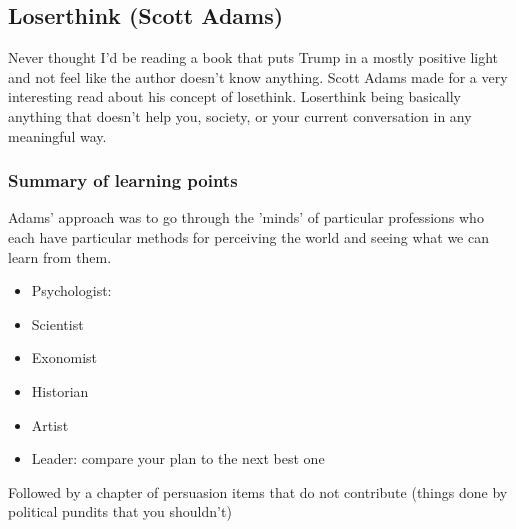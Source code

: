 \subsection{Loserthink (Scott Adams)}

Never thought I'd be reading a book that puts Trump in a mostly positive light and not feel like the author doesn't know anything.
Scott Adams made for a very interesting read about his concept of losethink. Loserthink being basically anything that doesn't help you, society, or your current conversation in any meaningful way.

\subsubsection{Summary of learning points}
Adams' approach was to go through the 'minds' of particular professions who each have particular methods for perceiving the world and seeing what we can learn from them.
\begin{itemize}
    \item Psychologist:
    \item Scientist
    \item Exonomist
    \item Historian
    \item Artist
    \item Leader: compare your plan to the next best one
\end{itemize}

Followed by a chapter of persuasion items that do not contribute (things done by political pundits that you shouldn't)
